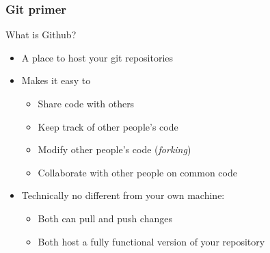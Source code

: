 \documentclass[mathserif, xcolor=dvipsnames]{beamer}
\begin{document}
\begin{frame}
    \frametitle{Git primer}
    \begin{block}{What is Github?}
    \begin{itemize}\addtolength{\itemsep}{0.5\baselineskip}
        \item{A place to host your git repositories}
        \item{Makes it easy to
              \begin{itemize}
                  \item{Share code with others}
                  \item{Keep track of other people's code}
                  \item{Modify other people's code (\emph{forking})}
                  \item{Collaborate with other people on common code}
              \end{itemize}}
        \item{Technically no different from your own machine:
              \begin{itemize}
                  \item{Both can pull and push changes}
                  \item{Both host a fully functional version of your repository}
              \end{itemize}}
    \end{itemize}
    \end{block}
\end{frame}
\end{document}
